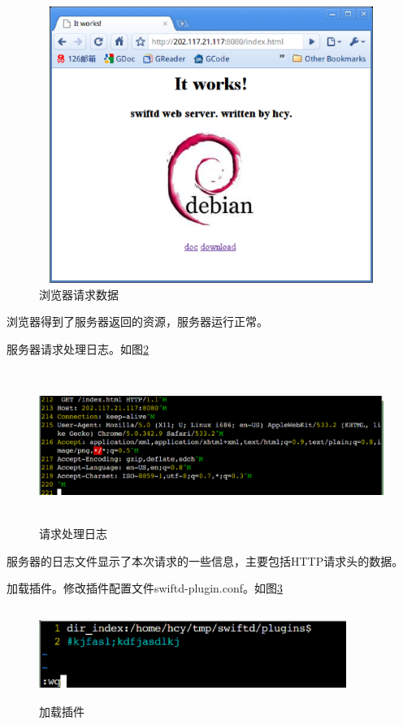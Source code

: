 \documentclass[12pt, twoside, a4paper, xetex]{report}
\begin{document}
	\begin{figure}[htbp]
	\centering
	\setlength{\abovecaptionskip}{0pt}
	\setlength{\belowcaptionskip}{10pt}
	\caption{浏览器请求数据}
	\label{access1}
	\includegraphics[height=9cm, width=12cm]{pics/access1.eps}
	\end{figure}
	
	浏览器得到了服务器返回的资源，服务器运行正常。
	
	服务器请求处理日志。如图\ref{access1log}
	
	\begin{figure}[htbp]
	\centering
	\setlength{\abovecaptionskip}{0pt}
	\setlength{\belowcaptionskip}{10pt}
	\caption{请求处理日志}
	\label{access1log}
	\includegraphics[height=5cm, width=15cm]{pics/access1log.eps}
	\end{figure}
	
	服务器的日志文件显示了本次请求的一些信息，主要包括HTTP请求头的数据。
	
	
	加载插件。修改插件配置文件swiftd-plugin.conf。如图\ref{pluginconf}
	\begin{figure}[htbp]
	\centering
	\setlength{\abovecaptionskip}{0pt}
	\setlength{\belowcaptionskip}{10pt}
	\caption{加载插件}
	\label{pluginconf}
	\includegraphics[height=3cm, width=10cm]{pics/pluginconf.eps}
	\end{figure}
	
\end{document}
